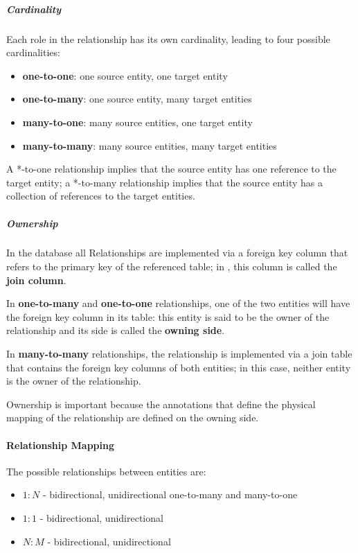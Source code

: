\documentclass[english]{article}
\begin{document}
\subparagraph*{Cardinality}
Each role in the relationship has its own cardinality, leading to four possible cardinalities:

\begin{itemize}
  \item \textbf{one-to-one}: one source entity, one target entity
  \item \textbf{one-to-many}: one source entity, many target entities
  \item \textbf{many-to-one}: many source entities, one target entity
  \item \textbf{many-to-many}: many source entities, many target entities
\end{itemize}

A *-to-one relationship implies that the source entity has one reference to the target entity;
a *-to-many relationship implies that the source entity has a collection of references to the target entities.

\subparagraph*{Ownership}
In the database all Relationships are implemented via a foreign key column that refers to the primary key of the referenced table;
in \jpa, this column is called the \textbf{join column}.

In \textbf{one-to-many} and \textbf{one-to-one} relationships, one of the two entities will have the foreign key column in its table:
this entity is said to be the owner of the relationship and its side is called the \textbf{owning side}.

In \textbf{many-to-many} relationships, the relationship is implemented via a join table that contains the foreign key columns of both entities;
in this case, neither entity is the owner of the relationship.

Ownership is important because the annotations that define the physical mapping of the relationship are defined on the owning side.

\paragraph{Relationship Mapping}

The possible relationships between entities are:

\begin{itemize}
  \item \(1:N\) - bidirectional, unidirectional one-to-many and many-to-one
  \item \(1:1\) - bidirectional, unidirectional
  \item \(N:M\) - bidirectional, unidirectional
\end{itemize}
\end{document}
